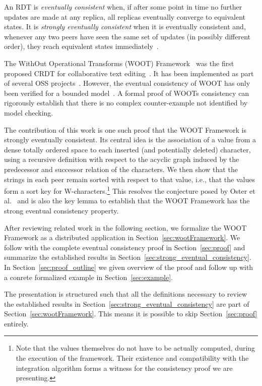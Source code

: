\documentclass[11pt,a4paper]{article}
\begin{document}
An RDT is \emph{eventually consistent} when, if after some point in time no further updates are made at any replica, all replicas eventually converge to equivalent states.
It is \emph{strongly eventually consistent} when it is eventually consistent and, whenever any two peers have seen the same set of updates (in possibly different order), they reach equivalent states immediately~\cite{shapiro2011conflict}.

The WithOut Operational Transforms (WOOT) Framework~\cite{oster2006data} was the first proposed CRDT for collaborative text editing~\cite{Briot2016}.
It has been implemented as part of several OSS projects~\cite{dallaway2016wootjs,emanouilov2016woot,kaplan2016woot,olson2016woot}.
However, the eventual consistency of WOOT has only been verified for a bounded model~\cite{oster2006data, oster2005real}.
A formal proof of WOOTs consistency can rigorously establish that there is no complex counter-example not identified by model checking.

The contribution of this work is one such proof that the WOOT Framework is strongly eventually consistent.
Its central idea is the association of a value from a dense totally ordered space to each inserted (and potentially deleted) character, using a recursive definition with respect to the acyclic graph induced by the predecessor and successor relation of the characters.
We then show that the strings in each peer remain sorted with respect to that value, i.e., that the values form a sort key for W-characters.\footnote{Note that the values themselves do not have to be actually computed, during the execution of the framework. Their existence and compatibility with the integration algorithm forms a witness for the consistency proof we are presenting.}
This resolves the conjecture posed by Oster et al.~\cite[conjecture 1]{oster2005real} and is also the key lemma to establish that the WOOT Framework has the strong eventual consistency property.

After reviewing related work in the following section, we formalize the WOOT Framework as a distributed application in Section~\ref{sec:wootFramework}.
We follow with the complete eventual consistency proof in Section~\ref{sec:proof} and summarize the established results in Section~\ref{sec:strong_eventual_consistency}. In Section~\ref{sec:proof_outline} we given overview of the proof
and follow up with a conrete formalized example in Section~\ref{sec:example}.

The presentation is structured such that all the definitions necessary to review the established results in Section~\ref{sec:strong_eventual_consistency} are part of Section~\ref{sec:wootFramework}.
This means it is possible to skip Section~\ref{sec:proof} entirely.
\end{document}
